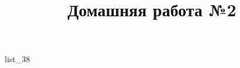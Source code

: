 \documentclass[12pt, a4paper]{article}
\begin{document}
	\title{Домашняя работа №2}
	{list_38}
\end{document}
